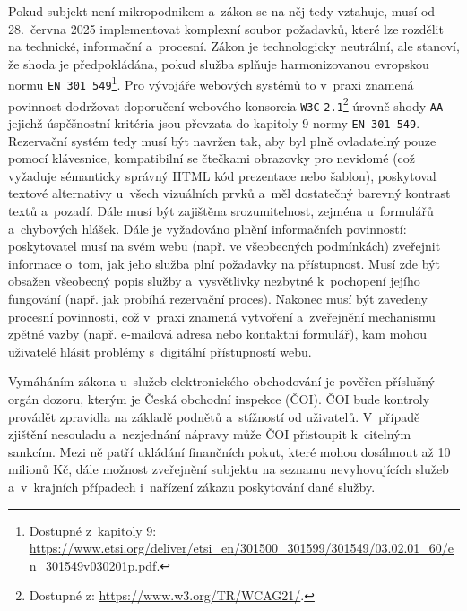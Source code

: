 Pokud subjekt není mikropodnikem a~zákon se na něj tedy vztahuje, musí od 28.~června 2025 implementovat komplexní soubor požadavků, které lze rozdělit na technické, informační a~procesní.
Zákon je technologicky neutrální, ale stanoví, že shoda je předpokládána, pokud služba splňuje harmonizovanou evropskou normu \texttt{EN 301 549}\footnote{Dostupné z~kapitoly 9: \url{https://www.etsi.org/deliver/etsi_en/301500_301599/301549/03.02.01_60/en_301549v030201p.pdf}.}.
Pro vývojáře webových systémů to v~praxi znamená povinnost dodržovat doporučení webového konsorcia \texttt{W3C} \texttt{2.1}\footnote{Dostupné z: \url{https://www.w3.org/TR/WCAG21/}.} úrovně shody \texttt{AA} jejichž úspěšnostní kritéria jsou převzata do kapitoly 9 normy \texttt{EN~301~549}.
Rezervační systém tedy musí být navržen tak, aby byl plně ovladatelný pouze pomocí klávesnice, kompatibilní se čtečkami obrazovky pro nevidomé (což vyžaduje sémanticky správný HTML kód prezentace nebo šablon), poskytoval textové alternativy u~všech vizuálních prvků a~měl dostatečný barevný kontrast textů a~pozadí.
Dále musí být zajištěna srozumitelnost, zejména u~formulářů a~chybových hlášek.
Dále je vyžadováno plnění informačních povinností: poskytovatel musí na svém webu (např. ve všeobecných podmínkách) zveřejnit informace o~tom, jak jeho služba plní požadavky na přístupnost.
Musí zde být obsažen všeobecný popis služby a~vysvětlivky nezbytné k~pochopení jejího fungování (např. jak probíhá rezervační proces).
Nakonec musí být zavedeny procesní povinnosti, což v~praxi znamená vytvoření a~zveřejnění mechanismu zpětné vazby (např. e-mailová adresa nebo kontaktní formulář), kam mohou uživatelé hlásit problémy s~digitální přístupností webu.

Vymáháním zákona u~služeb elektronického obchodování je pověřen příslušný orgán dozoru, kterým je Česká obchodní inspekce (ČOI).
ČOI bude kontroly provádět zpravidla na základě podnětů a~stížností od uživatelů.
V~případě zjištění nesouladu a~nezjednání nápravy může ČOI přistoupit k~citelným sankcím.
Mezi ně patří ukládání finančních pokut, které mohou dosáhnout až 10 milionů Kč, dále možnost zveřejnění subjektu na seznamu nevyhovujících služeb a~v~krajních případech i~nařízení zákazu poskytování dané služby.
